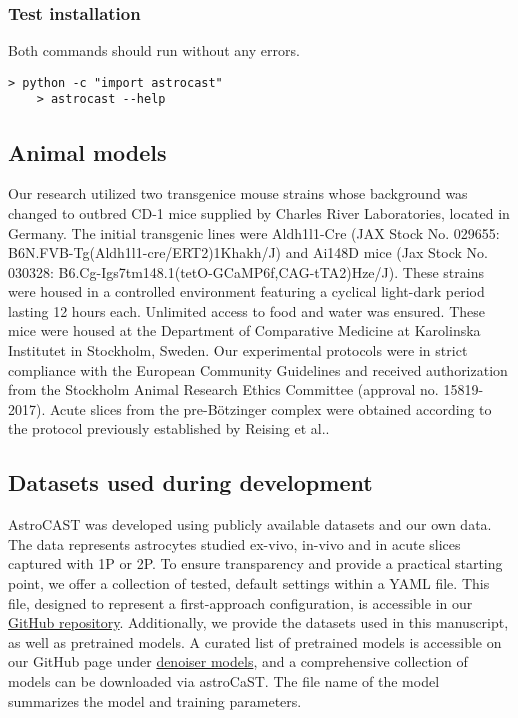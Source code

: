 \subsubsection{Test installation}

Both commands should run without any errors.

\begin{lstlisting}[style=bashStyle]
    > python -c "import astrocast"
    > astrocast --help
\end{lstlisting}

\subsection{Animal models}
Our research utilized two transgenice mouse strains whose background was changed to outbred CD-1 mice supplied by Charles River Laboratories, located in Germany. The initial transgenic lines were Aldh1l1-Cre (JAX Stock No. 029655: B6N.FVB-Tg(Aldh1l1-cre/ERT2)1Khakh/J) and Ai148D mice (Jax Stock No. 030328: B6.Cg-Igs7tm148.1(tetO-GCaMP6f,CAG-tTA2)Hze/J). These strains were housed in a controlled environment featuring a cyclical light-dark period lasting 12 hours each. Unlimited access to food and water was ensured. These mice were housed at the Department of Comparative Medicine at Karolinska Institutet in Stockholm, Sweden. Our experimental protocols were in strict compliance with the European Community Guidelines and received authorization from the Stockholm Animal Research Ethics Committee (approval no. 15819-2017). Acute slices from the pre-Bötzinger complex were obtained according to the protocol previously established by Reising et al.\citep{reising_prostaglandin_2022}.

\subsection{Datasets used during development}
\label{ref:dataset-availability}

AstroCAST was developed using publicly available datasets and our own data. The data represents astrocytes studied ex-vivo, in-vivo and in acute slices captured with \ac{1P} or \ac{2P}. To ensure transparency and provide a practical starting point, we offer a collection of tested, default settings within a YAML file. This file, designed to represent a first-approach configuration, is accessible in our \href{https://github.com/janreising/astroCAST}{GitHub repository}. Additionally, we provide the datasets used in this manuscript, as well as pretrained models. A curated list of pretrained models is accessible on our GitHub page under \href{https://github.com/janreising/astroCAST/tree/main/denoiser_models}{denoiser models}, and a comprehensive collection of models can be downloaded via astroCaST. The file name of the model summarizes the model and training parameters.

